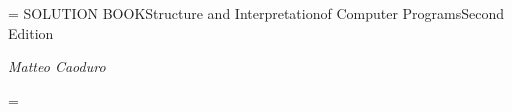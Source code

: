 \footline = {}
\decr\pageno
\tit SOLUTION BOOK\nl Structure and Interpretation\nl of Computer Programs\nl Second Edition
\bigskip
\centerline{\typoscale[1300/1300]\it Matteo Caoduro}
\vfill\eject
\footline = {\hss \rmfixed \folio \hss}
